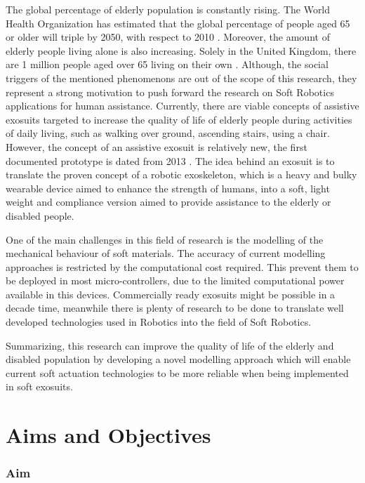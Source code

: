 The global percentage of elderly population is constantly rising. The World Health Organization has estimated that the global percentage of people aged 65 or older will triple by 2050, with respect to 2010 \cite{Colombo2012}. Moreover, the amount of elderly people living alone is also increasing. Solely in the United Kingdom, there are 1 million people aged over 65 living on their own \cite{Hill2019}. Although, the social triggers of the mentioned phenomenons are out of the scope of this research, they represent a strong motivation to push forward the research on Soft Robotics applications for human assistance. Currently, there are viable concepts of assistive exosuits targeted to increase the quality of life of elderly people during activities of daily living, such as walking over ground, ascending stairs, using a chair. However, the concept of an assistive exosuit is relatively new, the first documented prototype is dated from 2013 \cite{wehner2013lightweight}. The idea behind an exosuit is to translate the proven concept of a robotic exoskeleton, which is a heavy and bulky wearable device aimed to enhance the strength of humans, into a soft, light weight and compliance version aimed to provide assistance to the elderly or disabled people. 

One of the main challenges in this field of research is the modelling of the mechanical behaviour of soft materials. The accuracy of current modelling approaches is restricted by the computational cost required. This prevent them to be deployed in most micro-controllers, due to the limited computational power available in this devices. Commercially ready exosuits might be possible in a decade time, meanwhile there is plenty of research to be done to translate well developed technologies used in Robotics into the field of Soft Robotics.

Summarizing, this research can improve the quality of life of the elderly and disabled population by developing a novel modelling approach which will enable current soft actuation technologies to be more reliable when being implemented in soft exosuits.

\section{Aims and Objectives}

\subsubsection{Aim}

